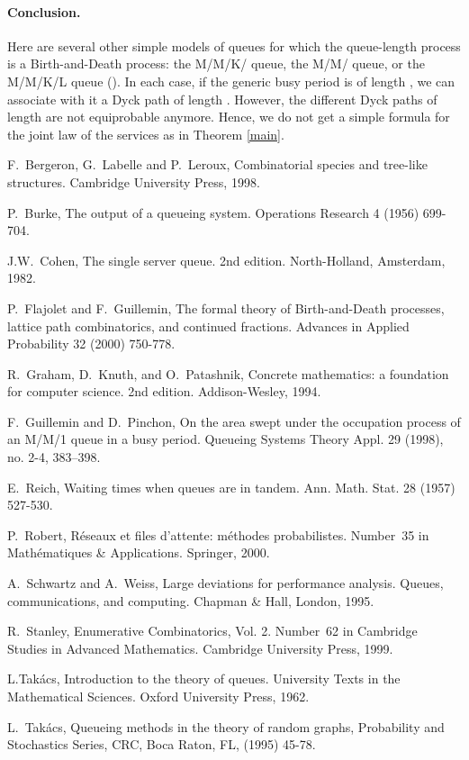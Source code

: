 \documentclass[11pt,a4paper]{article}
\numberwithin{equation}{section}
\newcommand{\1}{\mathbbm{1}}
\begin{document}
\paragraph{\bf Conclusion.}
Here are several other simple models of queues for which the queue-length process is a Birth-and-Death process: the M/M/K/ queue,
the M/M/ queue, or the M/M/K/L queue (). In each case, if the generic busy period is of length ,
we can associate with it a Dyck path of length . However, the different Dyck paths of length  are not equiprobable anymore.
Hence, we do not get a simple formula for the joint law of the services as in Theorem \ref{main}.
\begin{thebibliography}{1}

F.~Bergeron, G.~Labelle and P.~Leroux,
\newblock Combinatorial species and tree-like structures.
\newblock Cambridge University Press, 1998.

P.~Burke,
\newblock The output of a queueing system.
\newblock Operations Research 4 (1956) 699-704.

J.W.~Cohen,
\newblock The single server queue. 2nd edition.
\newblock North-Holland, Amsterdam, 1982.


P.~Flajolet and F.~Guillemin,
\newblock The formal theory of Birth-and-Death processes, lattice path combinatorics, and continued fractions.
\newblock Advances in Applied Probability 32 (2000) 750-778.

R.~Graham, D.~Knuth, and O.~Patashnik,
\newblock Concrete mathematics: a foundation for computer science. 2nd edition.
\newblock Addison-Wesley, 1994.

F.~Guillemin and D.~Pinchon,
\newblock On the area swept under the occupation process of an M/M/1 queue in a busy period. Queueing Systems Theory
Appl. 29 (1998), no. 2-4, 383--398.

E.~Reich,
\newblock Waiting times when queues are in tandem.
\newblock Ann. Math. Stat. 28 (1957) 527-530.

P.~Robert,
\newblock R\'eseaux et files d'attente: m\'ethodes probabilistes.
\newblock Number~35 in Math\'ematiques \& Applications. Springer, 2000.

A.~Schwartz and A.~Weiss,
\newblock Large deviations for performance analysis. Queues,
  communications, and computing.
\newblock Chapman \& Hall, London, 1995.


R.~Stanley,
\newblock Enumerative Combinatorics, Vol. 2.
\newblock Number~62 in Cambridge Studies in Advanced Mathematics. Cambridge
  University Press, 1999.

L.Tak\'{a}cs,
\newblock Introduction to the theory of queues.
\newblock University Texts in the Mathematical Sciences. Oxford University
  Press, 1962.

L.~Tak\'{a}cs,
\newblock Queueing methods in the theory of random graphs,
\newblock Probability and Stochastics Series, CRC, Boca Raton, FL, (1995) 45-78.

\end{thebibliography}
\end{document}
